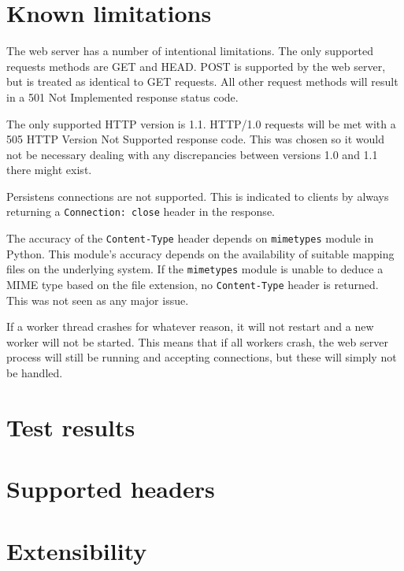 \documentclass{../sig-alternate}
\begin{document}
\section{Known limitations}

The web server has a number of intentional limitations. The only supported
requests methods are GET and HEAD. POST is supported by the web server, but
is treated as identical to GET requests. All other request methods will
result in a 501 Not Implemented response status code.

The only supported HTTP version is 1.1. HTTP/1.0 requests will be met with
a 505 HTTP Version Not Supported response code. This was chosen so it would
not be necessary dealing with any discrepancies between versions 1.0 and 1.1
there might exist.

Persistens connections are not supported. This is indicated to clients by
always returning a \verb+Connection: close+ header in the response.

The accuracy of the \verb+Content-Type+ header depends on \verb+mimetypes+
module in Python. This module's accuracy depends on the availability of
suitable mapping files on the underlying system. If the \verb+mimetypes+
module is unable to deduce a MIME type based on the file extension, no
\verb+Content-Type+ header is returned. This was not seen as any major issue.

If a worker thread crashes for whatever reason, it will not restart and a
new worker will not be started. This means that if all workers crash,
the web server process will still be running and accepting connections,
but these will simply not be handled.


\section{Test results}
\lipsum[10-14]


\section{Supported headers}
\lipsum[23-24]


\section{Extensibility}
\lipsum


%

\end{document}
